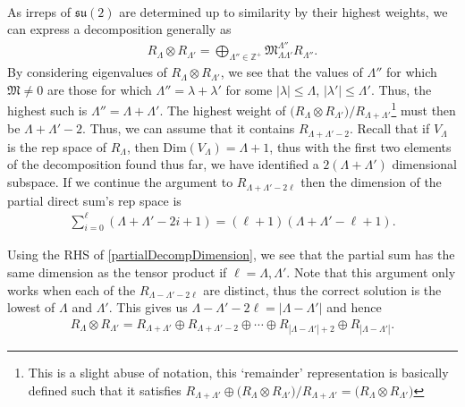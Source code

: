 \documentclass[11pt,fleqn]{article}
\begin{document}
\paragraph{} As irreps of $\mathfrak{su}(2)$ are determined up to similarity by their highest weights, we can express a decomposition generally as
	\begin{align}
		R_\Lambda \otimes R_{\Lambda'} = \bigoplus_{\Lambda'' \in \mathbb{Z}^+} \mathfrak{M}^{\Lambda''}_{\Lambda \Lambda'} R_{\Lambda''}.
	\end{align}
By considering eigenvalues of $R_\Lambda \otimes R_{\Lambda'}$, we see that the values of $\Lambda''$ for which $\mathfrak{M} \neq 0$ are those for which $\Lambda'' = \lambda + \lambda'$ for some $|\lambda| \leq \Lambda$, $|\lambda'| \leq \Lambda'$. Thus, the highest such is $\Lambda'' = \Lambda + \Lambda'$. The highest weight of $\big(R_\Lambda \otimes R_{\Lambda'}\big) / R_{\Lambda + \Lambda'}$\footnote{This is a slight abuse of notation, this `remainder' representation is basically defined such that it satisfies $R_{\Lambda + \Lambda'} \oplus \big(R_\Lambda \otimes R_{\Lambda'}\big) / R_{\Lambda + \Lambda'} = \big(R_\Lambda \otimes R_{\Lambda'}\big)$} must then be $\Lambda + \Lambda' - 2$. Thus, we can assume that it contains $R_{\Lambda + \Lambda' - 2}$. Recall that if $V_\Lambda$ is the rep space of $R_\Lambda$, then $\text{Dim} (V_\Lambda) = \Lambda + 1$, thus with the first two elements of the decomposition found thus far, we have identified a $2(\Lambda + \Lambda')$ dimensional subspace. If we continue the argument to $R_{\Lambda + \Lambda' - 2\ell}$ then the dimension of the partial direct sum's rep space is
	\begin{align}\label{partialDecompDimension}
		\sum_{i = 0}^\ell \left( \Lambda + \Lambda' - 2i + 1\right) = 
		(\ell + 1) (\Lambda + \Lambda' - \ell + 1).
	\end{align}

Using the RHS of \eqref{partialDecompDimension}, we see that the partial sum has the same dimension as the tensor product if $\ell = \Lambda, \Lambda'$. Note that this argument only works when each of the $R_{\Lambda - \Lambda' - 2\ell}$ are distinct, thus the correct solution is the lowest of $\Lambda$ and $\Lambda'$. This gives us $\Lambda - \Lambda' - 2\ell = |\Lambda - \Lambda'|$ and hence
	\begin{align}
		R_\Lambda \otimes R_{\Lambda'} = R_{\Lambda + \Lambda'} \oplus R_{\Lambda + \Lambda' - 2} \oplus \cdots \oplus R_{|\Lambda - \Lambda' | +2} \oplus R_{|\Lambda - \Lambda' |}.
	\end{align}
\end{document}
